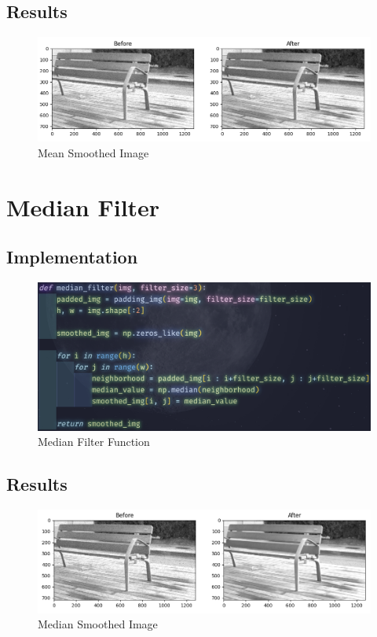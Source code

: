 \subsection{Results}
\begin{figure} [!h]
    \centering
    \includegraphics[width=1\textwidth]{img/mean_smoothed.png}
    \caption{Mean Smoothed Image}
\end{figure}

\newpage
\section{Median Filter}
\subsection{Implementation}
\begin{figure} [!h]
    \centering
    \includegraphics[width=1\textwidth]{img/code/median.png}
    \caption{Median Filter Function}
\end{figure}

\subsection{Results}
\begin{figure} [!h]
    \centering
    \includegraphics[width=1\textwidth]{img/median_smoothed.png}
    \caption{Median Smoothed Image}
\end{figure}